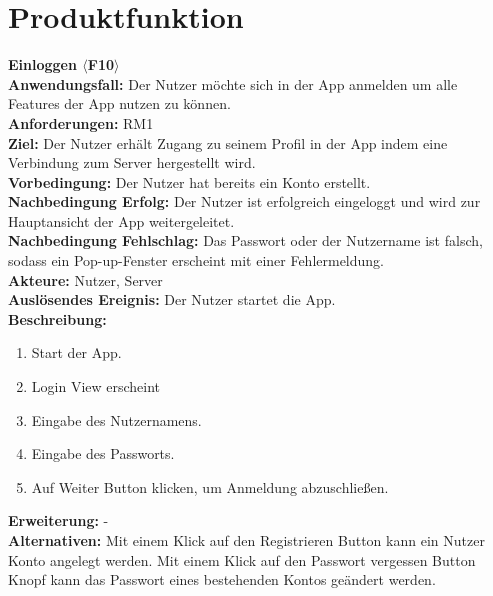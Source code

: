 \documentclass[parskip=full]{scrartcl}
\begin{document}
\section{Produktfunktion}
\textbf{Einloggen $\langle$F10$\rangle$}\\
\textbf{Anwendungsfall:} Der Nutzer möchte sich in der App anmelden um alle Features der App nutzen zu können.\\
\textbf{Anforderungen:} RM1\\
\textbf{Ziel:} Der Nutzer erhält Zugang zu seinem Profil in der App indem eine Verbindung zum Server hergestellt wird.\\
\textbf{Vorbedingung:} Der Nutzer hat bereits ein Konto erstellt.\\
\textbf{Nachbedingung Erfolg:} Der Nutzer ist erfolgreich eingeloggt und wird zur Hauptansicht der App weitergeleitet.\\
\textbf{Nachbedingung Fehlschlag:} Das Passwort oder der Nutzername ist falsch, sodass ein Pop-up-Fenster erscheint mit einer Fehlermeldung.\\
\textbf{Akteure:} Nutzer, Server\\
\textbf{Auslösendes Ereignis:} Der Nutzer startet die App.\\
\textbf{Beschreibung:}
\begin{enumerate}
    \item Start der App.
    \item Login View erscheint
    \item Eingabe des Nutzernamens.
    \item Eingabe des Passworts.
    \item Auf Weiter Button klicken, um Anmeldung abzuschließen.
\end{enumerate}
\textbf{Erweiterung:} -\\
\textbf{Alternativen:} Mit einem Klick auf den Registrieren Button kann ein Nutzer Konto angelegt werden. Mit einem Klick auf den Passwort vergessen Button Knopf kann das Passwort eines bestehenden Kontos geändert werden.  \\
\newpage
\end{document}
